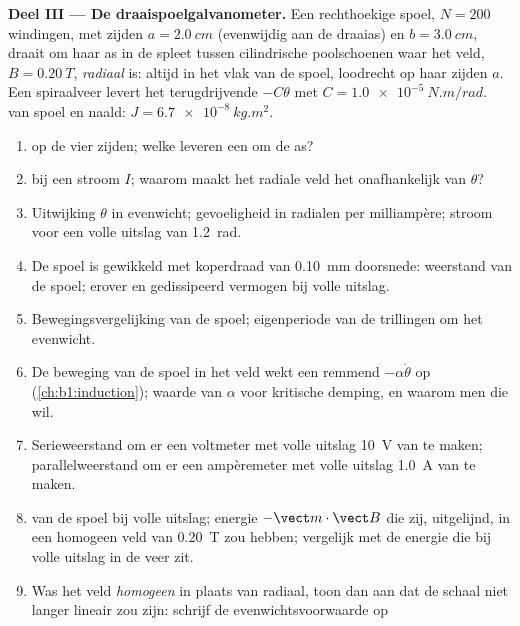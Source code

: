 \begin{problem}
\medskip
\noindent\textbf{Deel III --- De draaispoelgalvanometer.}
Een rechthoekige spoel, $N = 200$ windingen, met zijden $a = \qty{2.0}{cm}$ (evenwijdig aan
de draaias) en $b = \qty{3.0}{cm}$, draait om haar as in de
spleet tussen cilindrische poolschoenen waar het veld, $B = \qty{0.20}{T}$,
\emph{radiaal} is: altijd in het vlak van de spoel, loodrecht op haar
zijden $a$. Een spiraalveer levert het terugdrijvende  $-C\theta$ met
$C = \qty{1.0e-5}{N.m/rad}$.  van spoel en naald:
$J = \qty{6.7e-8}{kg.m^2}$.
\begin{enumerate}[resume]
  \item {} op de vier zijden; welke leveren een 
        om de as?
  \item {} bij een stroom $I$; waarom maakt het radiale veld het
        onafhankelijk van $\theta$?
  \item Uitwijking $\theta$ in evenwicht; gevoeligheid in radialen per
        milliampère; stroom voor een volle uitslag van \qty{1.2}{rad}.
  \item De spoel is gewikkeld met koperdraad van \qty{0.10}{mm} doorsnede:
        weerstand van de spoel;  erover en gedissipeerd vermogen bij
        volle uitslag.
  \item Bewegingsvergelijking van de spoel; eigenperiode van de
        trillingen om het evenwicht.
  \item De beweging van de spoel in het veld wekt een remmend 
        $-\alpha\dot\theta$ op (\cref{ch:b1:induction}); waarde van $\alpha$ voor
        kritische demping, en waarom men die wil.
  \item Serieweerstand om er een voltmeter met volle uitslag \qty{10}{V} van te maken; parallelweerstand
        om er een ampèremeter met volle uitslag \qty{1.0}{A} van te maken.
  \item {} van de spoel bij volle uitslag; energie $-\vect m\cdot
        \vect B$ die zij, uitgelijnd, in een homogeen veld van \qty{0.20}{T} zou hebben;
        vergelijk met de energie die bij volle uitslag in de veer zit.
  \item Was het veld \emph{homogeen} in plaats van radiaal, toon dan aan dat de
        schaal niet langer lineair zou zijn: schrijf de evenwichtsvoorwaarde op

\end{enumerate}
\end{problem}
